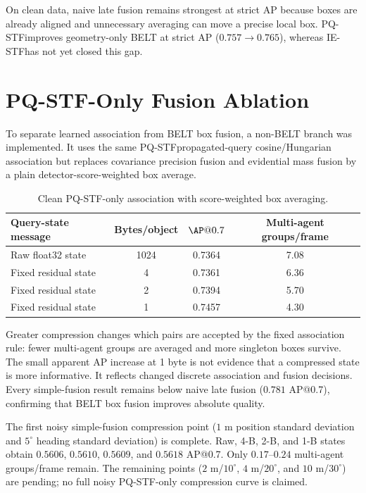 \documentclass[11pt]{article}
\newcommand{\PQSTF}{\textsc{PQ-STF}}
\newcommand{\IESTF}{\textsc{IE-STF}}
\begin{document}
On clean data, naive late fusion remains strongest at strict AP because boxes
are already aligned and unnecessary averaging can move a precise local box.
\PQSTF improves geometry-only BELT at strict AP ($0.757\rightarrow0.765$),
whereas \IESTF has not yet closed this gap.

\section{PQ-STF-Only Fusion Ablation}

To separate learned association from BELT box fusion, a non-BELT branch was
implemented. It uses the same \PQSTF propagated-query cosine/Hungarian
association but replaces covariance precision fusion and evidential mass
fusion by a plain detector-score-weighted box average.

\begin{table}[h]
\centering
\caption{Clean \PQSTF-only association with score-weighted box averaging.}
\label{tab:simple-pqstf}
\begin{tabular}{lccc}
\toprule
Query-state message & Bytes/object & $\AP@0.7$ & Multi-agent groups/frame\\
\midrule
Raw float32 state & 1024 & 0.7364 & 7.08\\
Fixed residual state & 4 & 0.7361 & 6.36\\
Fixed residual state & 2 & 0.7394 & 5.70\\
Fixed residual state & 1 & 0.7457 & 4.30\\
\bottomrule
\end{tabular}
\end{table}

Greater compression changes which pairs are accepted by the fixed association
rule: fewer multi-agent groups are averaged and more singleton boxes survive.
The small apparent AP increase at 1 byte is not evidence that a compressed
state is more informative. It reflects changed discrete association and fusion
decisions. Every simple-fusion result remains below naive late fusion
($0.781$ AP@0.7), confirming that BELT box fusion improves absolute quality.

The first noisy simple-fusion compression point ($1$ m position standard
deviation and $5^\circ$ heading standard deviation) is complete. Raw, 4-B,
2-B, and 1-B states obtain $0.5606$, $0.5610$, $0.5609$, and $0.5618$ AP@0.7.
Only $0.17$--$0.24$ multi-agent groups/frame remain. The remaining points
($2$ m/$10^\circ$, $4$ m/$20^\circ$, and $10$ m/$30^\circ$) are pending; no
full noisy PQ-STF-only compression curve is claimed.
\end{document}
